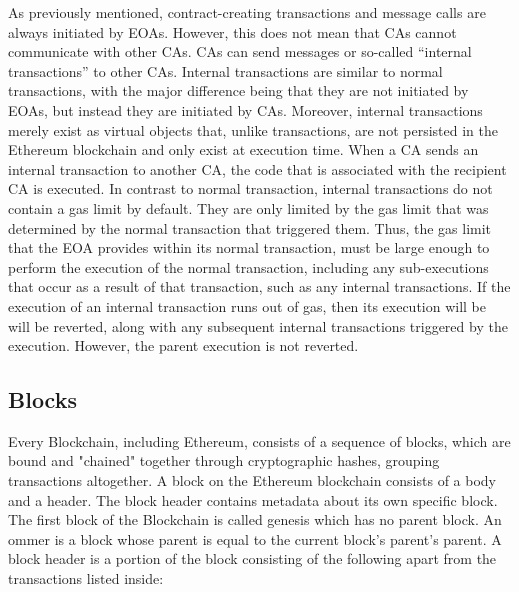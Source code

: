             As previously mentioned, contract-creating transactions and message calls are always initiated by EOAs.
            However, this does not mean that CAs cannot communicate with other CAs.
            CAs can send messages or so-called “internal transactions” to other CAs.
            Internal transactions are similar to normal transactions, with the major difference being that they are not initiated by EOAs, but instead they are initiated by CAs.
            Moreover, internal transactions merely exist as virtual objects that, unlike transactions, are not persisted in the Ethereum blockchain and only exist at execution time.
            When a CA sends an internal transaction to another CA, the code that is associated with the recipient CA is executed.
            In contrast to normal transaction, internal transactions do not contain a gas limit by default.
            They are only limited by the gas limit that was determined by the normal transaction that triggered them.
            Thus, the gas limit that the EOA provides within its normal transaction, must be large enough to perform the execution of the normal transaction, including any sub-executions that occur
            as a result of that transaction, such as any internal transactions.
            If the execution of an internal transaction runs out of gas, then its execution will be will be reverted, along with any subsequent internal transactions triggered by the execution.
            However, the parent execution is not reverted.

    \subsection{Blocks}
        Every Blockchain, including Ethereum, consists of a sequence of blocks, which are bound and "chained" together through cryptographic hashes, grouping transactions altogether.
        A block on the Ethereum blockchain consists of a body and a header.
        The block header contains metadata about its own specific block. 
        The first block of the Blockchain is called genesis which has no parent block.
        An ommer is a block whose parent is equal to the current block's parent's parent.
        A block header is a portion of the block consisting of the following apart from the transactions listed inside:

